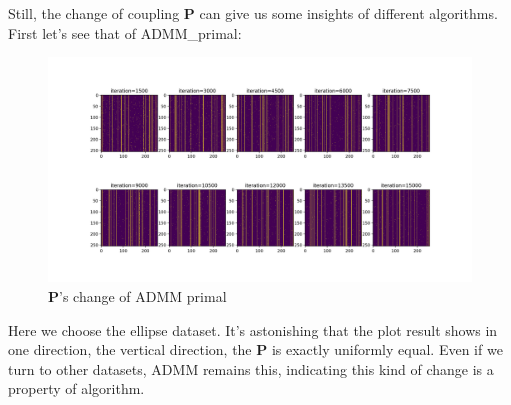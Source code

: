 \documentclass{article}
\begin{document}
\begin{large}
Still, the change of coupling  $\mathbf{P}$ can give us some insights of different algorithms. First let's see that of ADMM\_primal:
\begin{figure}[H] %
   \centering
   \includegraphics[width=5.5in]{pi_admm_primal_ellip_n16.png} 
   \caption{$\mathbf{P}$'s change of ADMM primal}
   \label{fig:example}
\end{figure}
Here we choose the ellipse dataset. It's astonishing that the plot result shows in one direction, the vertical direction, the $\mathbf{P}$ is exactly uniformly equal. Even if we turn to other datasets, ADMM remains this, indicating this kind of change is a property of algorithm.


\end{large}
\end{document}
